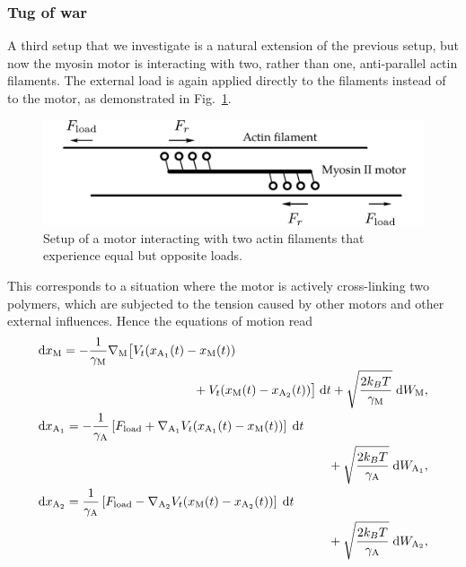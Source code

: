 \documentclass[aps,pre,twocolumn,showpacs,showkeys,superscriptaddress,floatfix]{revtex4-1}
\newcommand{\rmd}{{\mathrm d}}
\begin{document}
\subsubsection{Tug of war}
\label{sec:tug_of_war}
A third setup that we investigate is a natural extension of the previous setup, but now the myosin motor is interacting with two, rather than one, 
anti-parallel actin filaments. 
The external load is again applied directly to the filaments instead of to the motor, as demonstrated in Fig.~\ref{fig:tug_F_illustration}. 
\begin{figure}[t]
\centering
\includegraphics[width=0.9\linewidth,height=!]{tug_F_illustration}
\caption{
\label{fig:tug_F_illustration}
Setup of a motor interacting with two actin filaments that experience equal but opposite loads.
}
\end{figure}
This corresponds to a situation where the motor is actively cross-linking two polymers, which are subjected to the tension caused by other motors and other external influences.  
Hence the equations of motion read
\begin{equation}
\begin{gathered}
\begin{multlined}[b][.9\linewidth]
\rmd x_\text{M} = 
- \frac{1}{\gamma_\text{M}} \nabla_\text{M} \bigl[ 
V_t(x_{\text{A}_1}(t) - x_\text{M}(t)) 
\\
+ V_t(x_\text{M}(t) - x_{\text{A}_2}(t)) 
\bigr] \; \rmd t 
+ \sqrt{ \frac{2 k_B T}{\gamma_\text{M}} } \; \rmd W_\text{M} ,
\end{multlined}\\
\begin{multlined}[b][.9\linewidth]
\rmd x_{\text{A}_1} = 
- \frac{1}{\gamma_\text{A}} \left[ F_\text{load} + \nabla_{\text{A}_1} V_t(x_{\text{A}_1}(t) - x_\text{M}(t)) \right] \; \rmd t 
\\
+ \sqrt{ \frac{2 k_B T}{\gamma_\text{A}} } \; \rmd W_{\text{A}_1} ,
\end{multlined}\\
\begin{multlined}[b][.9\linewidth]
\rmd x_{\text{A}_2} = 
\frac{1}{\gamma_\text{A}} \left[ F_\text{load} - \nabla_{\text{A}_2} V_t(x_\text{M}(t) - x_{\text{A}_2}(t)) \right] \; \rmd t 
\\
+ \sqrt{ \frac{2 k_B T}{\gamma_\text{A}} } \; \rmd W_{\text{A}_2} ,
\end{multlined}
\end{gathered}
\label{eq:eom_two_actins}
\end{equation}
\end{document}
